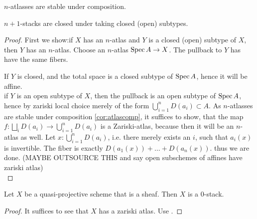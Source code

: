 \documentclass{article}
\begin{document}
\begin{corollary}{\label{cor:atlascomp}}
    $n$-atlasses are stable under composition.
\end{corollary}
\begin{lemma}
 $n+1$-stacks are closed under taking closed (open) subtypes.
\end{lemma}
\begin{proof}
First we show:if $X$ has an $n$-atlas and $Y$ is a closed (open) subtype of $X$, then $Y$ has an $n$-atlas. %
    Choose an $n$-atlas $\operatorname{Spec} A \to X$. The pullback to $Y$ has have the same fibers.
    
    If $Y$ is closed,  and the total space is a closed subtype of $\operatorname{Spec} A$, hence it will be affine. \\
    if $Y$ is an open subtype of $X$, then the pullback is an open subtype of $\operatorname{Spec} A$, hence by zariski local choice merely of the form $\bigcup_{i=1}^n D(a_i) \subset A$. 
    As $n$-atlasses are stable under composition \ref{cor:atlascomp}, it suffices to show, that the map $f : \bigsqcup_i D(a_i) \to \bigcup_{i=1}^n D(a_i)$ is a Zariski-atlas, because then it will be an $n$-atlas as well. Let $x : \bigcup_{i=1}^n D(a_i)$, i.e. there merely exists an $i$, such that $a_i(x)$ is invertible. The fiber is exactly $D(a_1(x)) + \hdots + D(a_n(x))$. thus we are done. (MAYBE OUTSOURCE THIS and say open subschemes of affines have zariski atlas)\\
    \end{proof}
\begin{corollary}
    Let $X$ be a quasi-projective scheme that is a sheaf. Then $X$ is a  0-stack. 
\end{corollary}   
\begin{proof}
    It suffices to see that $X$ has a zariski atlas. Use \label{ex:PnIsStack}.
\end{proof}
\end{document}
